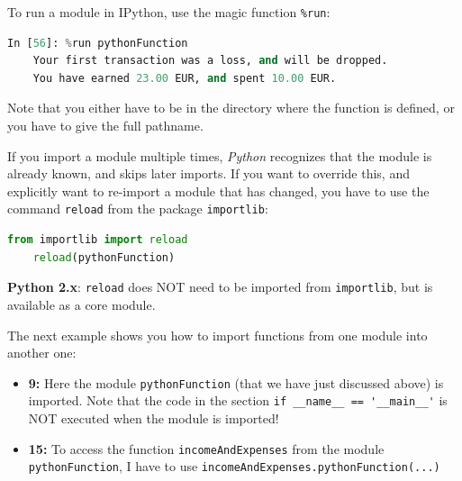 To run a module in IPython, use the magic function \lstinline{%run}:

\begin{lstlisting}[language=Python]
    In [56]: %run pythonFunction
    Your first transaction was a loss, and will be dropped.
    You have earned 23.00 EUR, and spent 10.00 EUR.
\end{lstlisting}

Note that you either have to be in the directory where the function is defined, or you have to give the full pathname.

If you import a module multiple times, \emph{Python} recognizes that the module is already known, and skips later imports. If you want to override this, and explicitly want to re-import a module that has changed, you have to use the command \lstinline{reload} from the package \lstinline{importlib}:

\begin{lstlisting}[language=Python]
    from importlib import reload
    reload(pythonFunction)
\end{lstlisting}

\textbf{Python 2.x}: \lstinline{reload} does NOT need to be imported from \lstinline{importlib}, but is available as a core module.

The next example shows you how to import functions from one module into another one:



\begin{itemize}
  \item \textbf{9:} Here the module \lstinline{pythonFunction} (that we have just discussed above) is imported. Note that the code in the section \lstinline{if __name__ == '__main__'} is NOT executed when the module is imported!

  \item \textbf{15:} To access the function \lstinline{incomeAndExpenses} from the module \lstinline{pythonFunction}, I have to use \lstinline{incomeAndExpenses.pythonFunction(...)}
\end{itemize}

